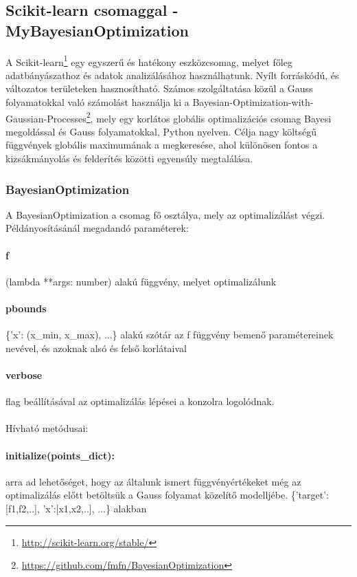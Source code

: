 \subsection{Scikit-learn csomaggal - MyBayesianOptimization}
A Scikit-learn\footnote{\url{http://scikit-learn.org/stable/}} egy egyszerű és hatékony eszközcsomag, melyet főleg adatbányászathoz és adatok analizálásához használhatunk. Nyílt forráskódú, és változatos területeken hasznosítható. Számos szolgáltatása közül a Gauss folyamatokkal való számolást használja ki a Bayesian-Optimization-with-Gaussian-Processes\footnote{\url{https://github.com/fmfn/BayesianOptimization}}, mely egy korlátos globális optimalizációs csomag Bayesi megoldással és Gauss folyamatokkal, Python nyelven. Célja nagy költségű függvények globális maximumának a megkeresése, ahol különösen fontos a kizsákmányolás és felderítés közötti egyensúly megtalálása.

\subsubsection{BayesianOptimization}

A BayesianOptimization a csomag fő osztálya, mely az optimalizálást végzi. Példányosításánál megadandó paraméterek:

\paragraph{f} (lambda **args: number) alakú függvény, melyet optimalizálunk
\paragraph{pbounds} \{'x': (x\_min, x\_max), ...\} alakú szótár
az f függvény bemenő paramétereinek nevével, és azoknak alsó és felső korlátaival
\paragraph{verbose} flag beállításával az optimalizálás lépései a konzolra logolódnak.\\\\
Hívható metódusai:

\paragraph{initialize(points\_dict):} arra ad lehetőséget, hogy az általunk ismert függvényértékeket még az optimalizálás előtt betöltsük a Gauss folyamat közelítő modelljébe. \{'target': [f1,f2,..], 'x':[x1,x2,..], ...\} alakban
